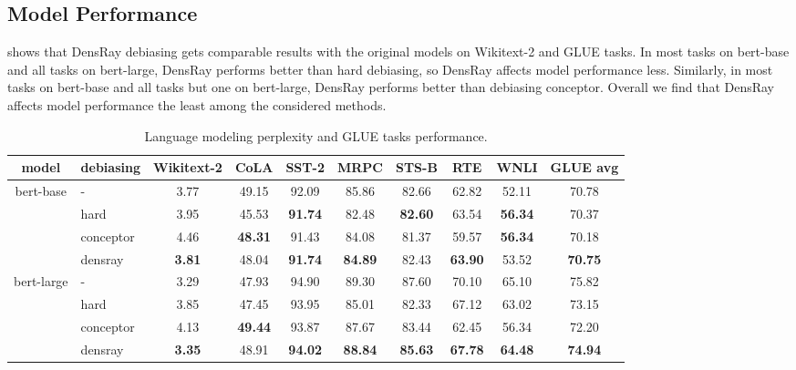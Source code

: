 \subsection{Model Performance}
 shows that DensRay debiasing gets comparable results with
the original models on Wikitext-2 and GLUE tasks.
In most tasks on bert-base and all tasks on bert-large, DensRay performs better than hard debiasing, so DensRay affects model performance less.
Similarly, in most tasks on bert-base and all tasks but one
on bert-large, DensRay performs better than debiasing conceptor. Overall we find that DensRay affects model performance the least among the considered methods.
\begin{table}[h]
\centering
\footnotesize
\vspace{-5pt}  
\setlength{\abovecaptionskip}{0.2cm}   
\setlength{\belowcaptionskip}{0cm}
\begin{tabular}{c|l||c|cccccc|c}
model&debiasing & Wikitext-2&CoLA &SST-2&MRPC&STS-B&RTE&WNLI&GLUE avg\\
\hline\hline
\multirow{4}{*}{bert-base}&- &3.77&49.15&92.09&85.86&82.66&62.82&52.11&70.78\\
&hard &3.95&45.53&\textbf{91.74}&82.48&\textbf{82.60}&63.54&\textbf{56.34}&70.37\\
&conceptor &4.46&\textbf{48.31}&91.43&84.08&81.37&59.57&\textbf{56.34}&70.18\\
&densray &\textbf{3.81}&48.04&\textbf{91.74}&\textbf{84.89}&82.43&\textbf{63.90}&53.52&\textbf{70.75}\\
\hline
\multirow{4}{*}{bert-large}&- 
&3.29& 47.93&94.90&89.30&87.60&70.10&65.10&75.82\\
&hard &3.85& 47.45&93.95&85.01&82.33&67.12&63.02&73.15\\
&conceptor &4.13&\textbf{49.44}&93.87&87.67&83.44&62.45&56.34&72.20\\
&densray &\textbf{3.35}& 48.91&\textbf{94.02}&\textbf{88.84}&\textbf{85.63}&\textbf{67.78}&\textbf{64.48}&\textbf{74.94}\\
\end{tabular}
\caption{
Language modeling perplexity and GLUE tasks
performance. }
\end{table}


